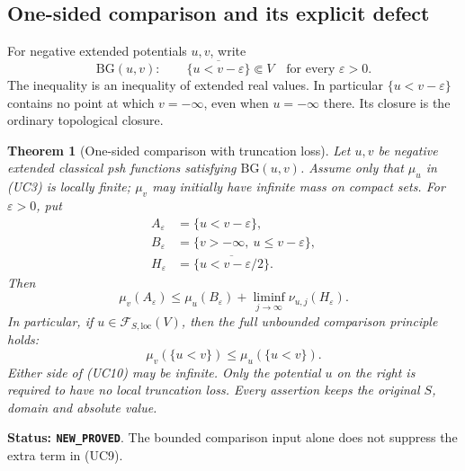 \documentclass[11pt,a4paper]{article}
\numberwithin{equation}{section}
\newtheorem{theorem}{Theorem}[section]
\theoremstyle{definition}
\theoremstyle{remark}
\begin{document}
\subsection{One-sided comparison and its explicit defect}

For negative extended potentials $u,v$, write
\[
 \mathrm{BG}(u,v):\qquad
     \overline{\{u<v-\varepsilon\}}\Subset V
                   \quad\text{for every }\varepsilon>0.
 \tag{UC8}
\]
The inequality is an inequality of extended real values. In
particular $\{u<v-\varepsilon\}$ contains no point at which
$v=-\infty$, even when $u=-\infty$ there. Its closure is
the ordinary topological closure.

\begin{theorem}[One-sided comparison with truncation loss]
\label{thm:r11-unbounded-defect-comparison}
Let $u,v$ be negative extended classical psh functions satisfying
$\mathrm{BG}(u,v)$. Assume only that $\mu_u$ in (UC3) is
locally finite; $\mu_v$ may initially have infinite mass on
compact sets. For $\varepsilon>0$, put
\[
 \begin{split}
 A_\varepsilon&=\{u<v-\varepsilon\},\\
 B_\varepsilon&=\{v> -\infty,\ u\leq v-\varepsilon\},\\
 H_\varepsilon&=\overline{\{u<v-\varepsilon/2\}}.
 \end{split}
\]
Then
\[
 \mu_v(A_\varepsilon)
 \leq \mu_u(B_\varepsilon)
             +\liminf_{j\to\infty}\nu_{u,j}(H_\varepsilon).
 \tag{UC9}
\]
In particular, if $u\in\mathcal F_{S,\mathrm{loc}}(V)$,
then the full unbounded comparison principle holds:
\[
                   \boxed{\quad
       \mu_v(\{u<v\})\leq\mu_u(\{u<v\}).\quad}
 \tag{UC10}
\]
Either side of (UC10) may be infinite. Only the potential $u$
on the right is required to have no local truncation loss.
Every assertion keeps the original $S$, domain and absolute value.
\end{theorem}

\noindent\textbf{Status: \texttt{NEW\_PROVED}}. The bounded
comparison input alone does not suppress the extra term in (UC9).
\end{document}
